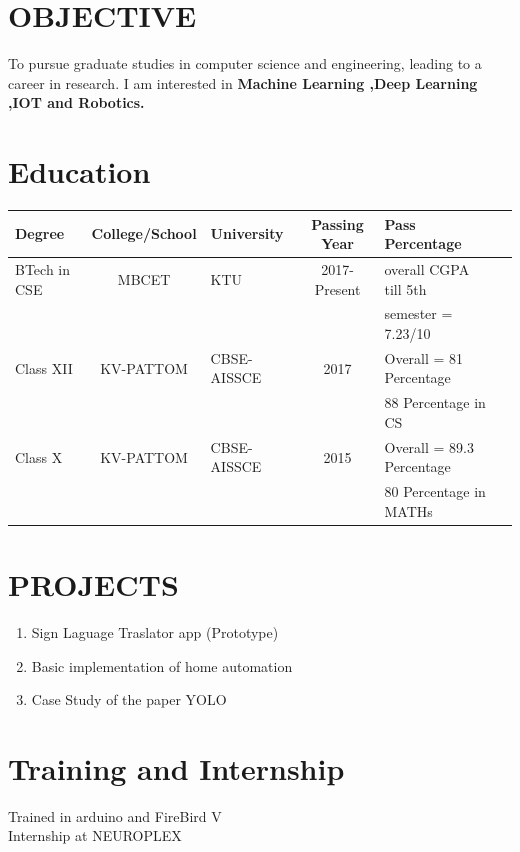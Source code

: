 \documentclass[margin,line]{res}
\begin{document}
\begin{resume}
	\section{\sc OBJECTIVE}

To pursue graduate studies in computer science and engineering, leading to a career in research. I am interested in \bf Machine Learning ,Deep Learning ,IOT and Robotics. 

\vspace{.1in}
\section{\sc Education}
\begin{tabular}{|l|c|l|c|l|c|}\hline
	\bf Degree&\bf College/School&\bf University&\bf Passing Year&\bf Pass Percentage \\ \hline
	BTech in CSE
	&MBCET & KTU & 2017-Present&overall CGPA till 5th\\ &&&&semester  = 7.23/10 \\ \hline
	Class XII
	&KV-PATTOM & CBSE-AISSCE  & 2017& Overall = 81 Percentage \\&&&&88 Percentage in CS 
	
	\\ \hline
	Class X
	&KV-PATTOM & CBSE-AISSCE  & 2015& Overall = 89.3 Percentage \\&&&&80 Percentage in MATHs 
	
	\\ \hline
\end{tabular}	
\section{\sc PROJECTS}

\begin{enumerate} %
	\item Sign Laguage Traslator app (Prototype) \\
	\item Basic implementation of home automation\\
	\item Case Study of the paper YOLO\\
	
\end{enumerate}

\section{\sc Training and Internship}
Trained in arduino and FireBird V\\
Internship at NEUROPLEX \\

\end{resume}
\end{document}
